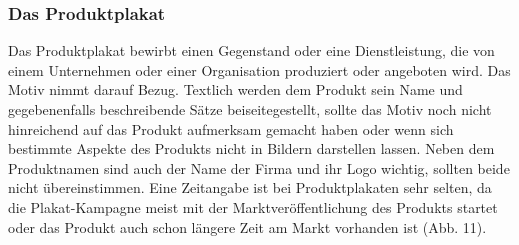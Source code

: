 \documentclass[a4paper,12pt,ngerman]{article}
\begin{document}
\subsubsection{Das Produktplakat}
Das Produktplakat bewirbt einen Gegenstand oder eine Dienstleistung, die von einem Unternehmen oder einer Organisation produziert oder angeboten wird. Das Motiv nimmt darauf Bezug. Textlich werden dem Produkt sein Name und gegebenenfalls beschreibende Sätze beiseitegestellt, sollte das Motiv noch nicht hinreichend auf das Produkt aufmerksam gemacht haben oder wenn sich bestimmte Aspekte des Produkts nicht in Bildern darstellen lassen. Neben dem Produktnamen sind auch der Name der Firma und ihr Logo wichtig, sollten beide nicht übereinstimmen. Eine Zeitangabe ist bei Produktplakaten sehr selten, da die Plakat-Kampagne meist mit der Marktveröffentlichung des Produkts startet oder das Produkt auch schon längere Zeit am Markt vorhanden ist (Abb. 11). \\
\end{document}
